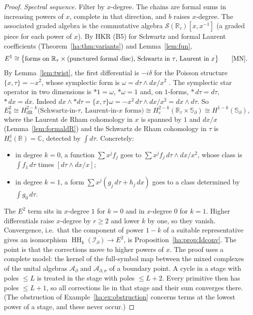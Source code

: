 \documentclass[11pt,oneside,reqno]{article}
\DeclareMathOperator{\HH}{HH}
\newcommand{\C}{\mathbb C}
\newcommand{\R}{\mathbb R}
\newcommand{\cS}{\mathcal S}
\newcommand{\Id}{\mathcal I_\partial}
\newcommand{\Ad}{\mathcal A_\partial}
\newcommand{\Ads}{\mathcal A_{\partial,\sigma}}
\newcommand{\Sd}{\mathbb S_\partial}
\theoremstyle{plain}
\theoremstyle{definition}
\theoremstyle{remark}
\begin{document}
\begin{proof}
\emph{Spectral sequence.} Filter by \(x\)-degree. The chains are formal
sums in increasing powers of \(x\), complete in that direction, and \(b\)
raises \(x\)-degree. The associated graded algebra is the commutative
algebra \(\cS(\R_\tau)[x,x^{-1}]\) (a graded piece for each power of
\(x\)). By HKR (B5) for Schwartz and formal Laurent coefficients
(Theorem~\ref{ha:thm:variants}) and Lemma~\ref{lem:fun},
\[
 E^1\cong\bigl\{\text{forms on }\R_\tau\times(\text{punctured formal disc})
 \text{, Schwartz in }\tau\text{, Laurent in }x\bigr\}
 \qquad\text{\cite[(42)]{MN}}.
\]
By Lemma~\ref{lem:twist}, the first differential is \(-i\delta\) for the
Poisson structure \(\{x,\tau\}=-x^2\), whose symplectic form is
\(\omega=d\tau\wedge dx/x^2\) \cite[p.~16]{MN}. The symplectic star
operator in two dimensions is \(*1=\omega\), \(*\omega=1\) and, on
\(1\)-forms, \(*\,d\tau=d\tau\), \(*\,dx=dx\). Indeed
\(dx\wedge*d\tau=\{x,\tau\}\omega=-x^2\,d\tau\wedge dx/x^2=dx\wedge d\tau\).
So
\[
 E^2_k\cong H^{2-k}_{\mathrm{dR}}\bigl(\text{Schwartz-in-}\tau,\
 \text{Laurent-in-}x\text{ forms}\bigr)
 \cong H^{2-k}_c(\R_\tau\times\Sd)\cong H^{1-k}(\Sd),
\]
where the Laurent de Rham cohomology in \(x\) is spanned by \(1\) and
\(dx/x\) (Lemma~\ref{lem:formaldR}) and the Schwartz de Rham cohomology
in \(\tau\) is \(H^1_c(\R)=\C\), detected by \(\int d\tau\). Concretely:
\begin{itemize}
\item in degree \(k=0\), a function \(\sum x^jf_j\) goes to
\(\sum x^jf_j\,d\tau\wedge dx/x^2\), whose class is \(\int f_1\,d\tau\)
times \([d\tau\wedge dx/x]\);
\item in degree \(k=1\), a form \(\sum x^j(g_j\,d\tau+h_j\,dx)\) goes to a
class determined by \(\int g_0\,d\tau\).
\end{itemize}
The \(E^2\) term sits in \(x\)-degree \(1\) for \(k=0\) and in \(x\)-degree
\(0\) for \(k=1\). Higher differentials raise \(x\)-degree by \(r\ge2\)
and lower \(k\) by one, so they vanish. Convergence, i.e.\ that the
component of power \(1-k\) of a suitable representative gives an
isomorphism \(\HH_k(\Id)\to E^2\), is Proposition~\ref{ha:prop:Idconv}.
The point is that the corrections move to higher powers of \(x\). The
proof uses a complete model: the kernel of the full-symbol map between
the mixed complexes of the unital algebras \(\Ad\) and \(\Ads\) of a
boundary point. A cycle in a stage with poles \(\le L\) is treated in the
stage with poles \(\le L+2\). Every primitive then has poles \(\le L+1\),
so all corrections lie in that stage and their sum converges there.
(The obstruction of Example~\ref{ha:ex:obstruction} concerns terms at
the lowest power of a stage, and these never occur.)


\end{proof}
\end{document}
